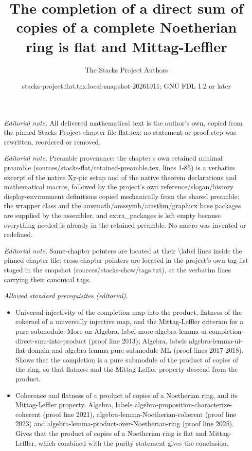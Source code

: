 \documentclass[10pt,a4paper]{amsart}
\title{The completion of a direct sum of copies of a complete Noetherian ring is flat and Mittag-Leffler}
\author{The Stacks Project Authors}
\date{stacks-project:flat.tex:local-snapshot-20261011; GNU FDL 1.2 or later}
\theoremstyle{plain}
\theoremstyle{definition}
\theoremstyle{remark}
\numberwithin{equation}{subsection}
\begin{document}
\maketitle
\noindent\textit{Editorial note.} All delivered mathematical text is the author's own, copied from the pinned Stacks Project chapter file flat.tex; no statement or proof step was rewritten, reordered or removed.\par\medskip
\noindent\textit{Editorial note.} Preamble provenance: the chapter's own retained minimal preamble (sources/stacks-flat/retained-preamble.tex, lines 1-85) is a verbatim excerpt of the native Xy-pic setup and of the native theorem declarations and mathematical macros, followed by the project's own reference/slogan/history display-environment definitions copied mechanically from the shared preamble; the wrapper class and the amsmath/amssymb/amsthm/graphicx base packages are supplied by the assembler, and extra\_packages is left empty because everything needed is already in the retained preamble. No macro was invented or redefined.\par\medskip
\noindent\textit{Editorial note.} Same-chapter pointers are located at their \textbackslash{}label lines inside the pinned chapter file; cross-chapter pointers are located in the project's own tag list staged in the snapshot (sources/stacks-chow/tags.txt), at the verbatim lines carrying their canonical tags.\par\medskip
\noindent\textit{Allowed standard prerequisites (editorial).}\begin{itemize}
\item Universal injectivity of the completion map into the product, flatness of the cokernel of a universally injective map, and the Mittag-Leffler criterion for a pure submodule. More on Algebra, label more-algebra-lemma-ui-completion-direct-sum-into-product (proof line 2013); Algebra, labels algebra-lemma-ui-flat-domain and algebra-lemma-pure-submodule-ML (proof lines 2017-2018). Shows that the completion is a pure submodule of the product of copies of the ring, so that flatness and the Mittag-Leffler property descend from the product.
\item Coherence and flatness of a product of copies of a Noetherian ring, and its Mittag-Leffler property. Algebra, labels algebra-proposition-characterize-coherent (proof line 2021), algebra-lemma-Noetherian-coherent (proof line 2023) and algebra-lemma-product-over-Noetherian-ring (proof line 2025). Gives that the product of copies of a Noetherian ring is flat and Mittag-Leffler, which combined with the purity statement gives the conclusion.
\end{itemize}\medskip
\end{document}
